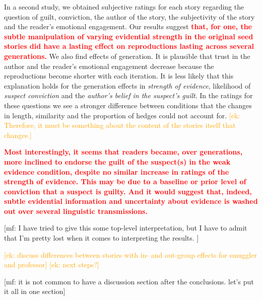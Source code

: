 \documentclass[10pt,letterpaper]{article}
\newcommand{\ek}[1]{\textcolor{Orange}{[ek: #1]}}
\newcommand{\mf}[1]{\textcolor{PinkyPurple}{[mf: #1]}}
\begin{document}
In a second study, we obtained subjective ratings for each story regarding the question of guilt, conviction, the author of the story, the subjectivity of the story and the reader's emotional engagement. Our results suggest \textbf{\textcolor{red}{that, for one, the subtle manipulation of varying evidential strength in the original seed stories did have a lasting effect on reproductions lasting across several generations.}} We also find effects of generation. It is plausible that trust in the author and the reader's emotional engagement decrease because the reproductions become shorter with each iteration. It is less likely that this explanation holds for the generation effects in \textit{strength of evidence}, likelihood of \textit{suspect conviction} and the \textit{author's belief in the suspect's guilt}. In the ratings for these questions we see a stronger difference between conditions that the changes in length, similarity and the proportion of hedges could not account for. \ek{Therefore, it must be something about the content of the stories itself that changes.}

\textbf{\textcolor{red}{ Most interestingly, it seems that readers became, over generations, more inclined to endorse the guilt of the suspect(s) in the weak evidence condition, despite no similar increase in ratings of the strength of evidence. This may be due to a baseline or prior level of conviction that a suspect is guilty. And it would suggest that, indeed, subtle evidential information and uncertainty about evidence is washed out over several linguistic transmissions.}}

\mf{I have tried to give this some top-level interpretation, but I have to admit that I'm pretty lost when it comes to interpreting the results. }

    
\ek{discuss differences between stories with in- and out-group effects for smuggler and professor}
\ek{next steps?}

\mf{it is not common to have a discussion section after the conclusions. let's put it all in one section}



\setlength{\bibleftmargin}{.125in}
\setlength{\bibindent}{-\bibleftmargin}


\end{document}
